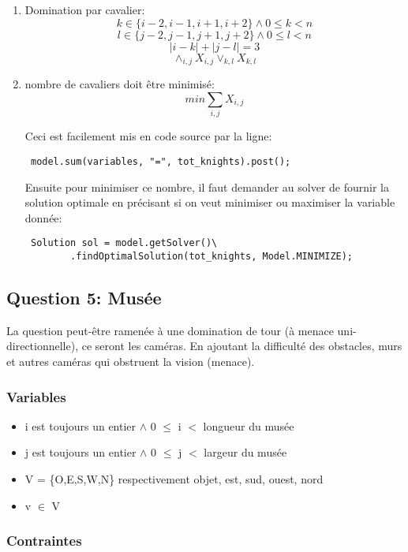 \begin{enumerate}
    \item Domination par cavalier:
    \[  k \in \{i-2, i-1, i+1, i+2\} \land 0 \leq k < n \]
    \[  l \in \{j-2, j-1, j+1, j+2\} \land 0 \leq l < n \]
    \[  |i-k| + |j-l| = 3 \]
    \[  \land_{i,j} X_{i,j} \lor_{k,l} X_{k,l} \]
    
    \item nombre de cavaliers doit être minimisé:
    \[  min \sum_{i,j} X_{i,j} \]
    
    Ceci est facilement mis en code source par la ligne:
    \begin{verbatim} model.sum(variables, "=", tot_knights).post(); \end{verbatim}
    
    Ensuite pour minimiser ce nombre, il faut demander au solver de fournir la solution optimale en précisant si on veut minimiser ou maximiser la variable donnée:
    \begin{verbatim} Solution sol = model.getSolver()\
        .findOptimalSolution(tot_knights, Model.MINIMIZE); \end{verbatim}
\end{enumerate}

\newpage

\subsection{Question 5: Musée}
La question peut-être ramenée à une domination de tour (à menace uni-directionnelle), ce seront les caméras. En ajoutant la difficulté des obstacles, murs et autres caméras qui obstruent la vision (menace).\\

\subsubsection{Variables}

\begin{itemize}
    \item i est toujours un entier $\land$ 0 $\leq$ i $<$ longueur du musée
    \item j est toujours un entier $\land$ 0 $\leq$ j $<$ largeur du musée
    \item V = \{O,E,S,W,N\} respectivement objet, est, sud, ouest, nord
    \item v $\in$ V
\end{itemize}


\subsubsection{Contraintes}

